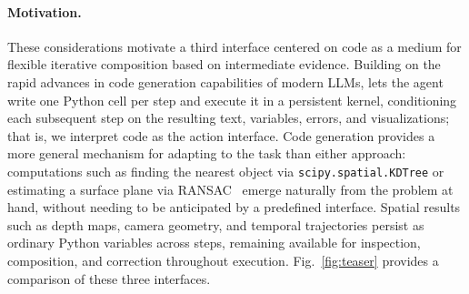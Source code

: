 \paragraph{Motivation.} These considerations motivate a third interface centered on code as a medium for flexible iterative composition based on intermediate evidence.
Building on the rapid advances in code generation capabilities of modern LLMs, \ours{} lets the agent write one Python cell per step and execute it in a persistent kernel, conditioning each subsequent step on the resulting text, variables, errors, and visualizations; that is, we interpret code as the action interface.
Code generation provides a more general mechanism for adapting to the task than either approach: computations such as finding the nearest object via \texttt{scipy.spatial.KDTree} or estimating a surface plane via RANSAC~\citep{fischler1981random} emerge naturally from the problem at hand, without needing to be anticipated by a predefined interface.
Spatial results such as depth maps, camera geometry, and temporal trajectories persist as ordinary Python variables across steps, remaining available for inspection, composition, and correction throughout execution.
Fig.~\ref{fig:teaser} provides a comparison of these three interfaces.
